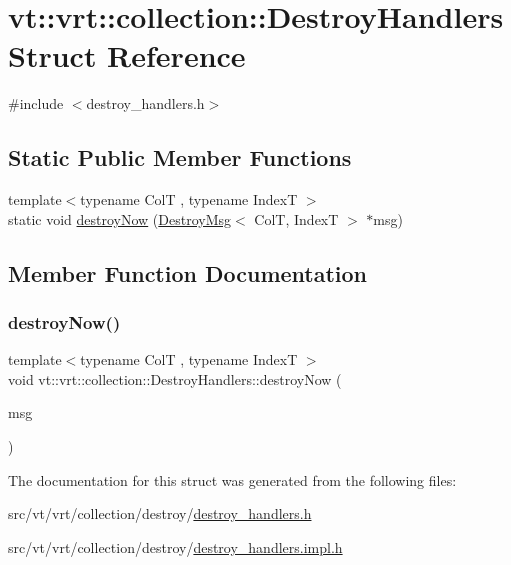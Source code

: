 \hypertarget{structvt_1_1vrt_1_1collection_1_1_destroy_handlers}{}\section{vt\+:\+:vrt\+:\+:collection\+:\+:Destroy\+Handlers Struct Reference}
\label{structvt_1_1vrt_1_1collection_1_1_destroy_handlers}


{\ttfamily \#include $<$destroy\+\_\+handlers.\+h$>$}

\subsection*{Static Public Member Functions}
\begin{DoxyCompactItemize}
\item 
{\footnotesize template$<$typename ColT , typename IndexT $>$ }\\static void \hyperlink{structvt_1_1vrt_1_1collection_1_1_destroy_handlers_a27d991f4d45f8ec50b6f32a49ca84970}{destroy\+Now} (\hyperlink{structvt_1_1vrt_1_1collection_1_1_destroy_msg}{Destroy\+Msg}$<$ ColT, IndexT $>$ $\ast$msg)
\end{DoxyCompactItemize}


\subsection{Member Function Documentation}
\mbox{\label{structvt_1_1vrt_1_1collection_1_1_destroy_handlers_a27d991f4d45f8ec50b6f32a49ca84970}} 
\subsubsection{\texorpdfstring{destroy\+Now()}{destroyNow()}}
{\footnotesize\ttfamily template$<$typename ColT , typename IndexT $>$ \\
void vt\+::vrt\+::collection\+::\+Destroy\+Handlers\+::destroy\+Now (\begin{DoxyParamCaption}\item[{\hyperlink{structvt_1_1vrt_1_1collection_1_1_destroy_msg}{Destroy\+Msg}$<$ ColT, IndexT $>$ $\ast$}]{msg }\end{DoxyParamCaption})\hspace{0.3cm}{\ttfamily [static]}}



The documentation for this struct was generated from the following files\+:\begin{DoxyCompactItemize}
\item 
src/vt/vrt/collection/destroy/\hyperlink{destroy__handlers_8h}{destroy\+\_\+handlers.\+h}\item 
src/vt/vrt/collection/destroy/\hyperlink{destroy__handlers_8impl_8h}{destroy\+\_\+handlers.\+impl.\+h}\end{DoxyCompactItemize}
